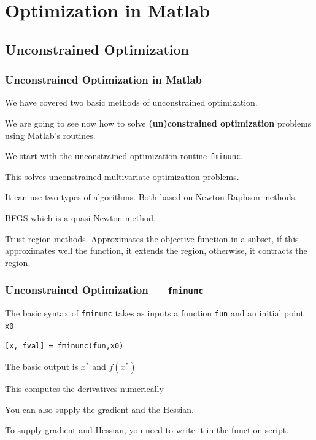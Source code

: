 \documentclass[11pt,xcolor={svgnames},aspectratio=169,usepdftitle=false]{beamer}
\let\toneitemize\itemize
\let\ttwoitemize\enditemize
\renewenvironment{itemize}{\toneitemize\addtolength{\itemsep}{0.7\baselineskip}}{\ttwoitemize}
\begin{document}
\section{Optimization in Matlab}

\subsection{Unconstrained Optimization}

\begin{frame}
  \frametitle{Unconstrained Optimization in Matlab}
\begin{itemize}
  \item We have covered two basic methods of unconstrained optimization.
  \item We are going to see now how to solve \alert{\textbf{(un)constrained optimization}} problems using Matlab's routines.
  \item We start with the unconstrained optimization routine \href{https://www.mathworks.com/help/optim/ug/fminunc.html}{\texttt{fminunc}}.
  \item This solves unconstrained multivariate optimization problems.
  \item It can use two types of algorithms. Both based on Newton-Raphson methods.
  \begin{itemize}
    \item \href{https://en.wikipedia.org/wiki/Broyden-Fletcher-Goldfarb-Shanno_algorithm}{BFGS} which is a quasi-Newton method.
    \item \href{https://www.mathworks.com/help/optim/ug/unconstrained-nonlinear-optimization-algorithms.html\#brnpcy5}{Trust-region methods}. Approximates the objective function in a subset, if this approximates well the function, it extends the region, otherwise, it contracts the region.
  \end{itemize}
\end{itemize}
\end{frame}

\begin{frame}[fragile]
  \frametitle{Unconstrained Optimization --- \texttt{fminunc}}
The basic syntax of \verb;fminunc; takes as inputs a function \verb;fun; and an initial point \verb;x0; 
\begin{lstlisting}
[x, fval] = fminunc(fun,x0)
\end{lstlisting}
The basic output is $x^*$ and $f(x^*)$

\begin{itemize}
  \item This computes the derivatives numerically
  \item You can also supply the gradient and the Hessian.
  \item To supply gradient and Hessian, you need to write it in the function script.
\end{itemize}
\end{frame}
\end{document}
